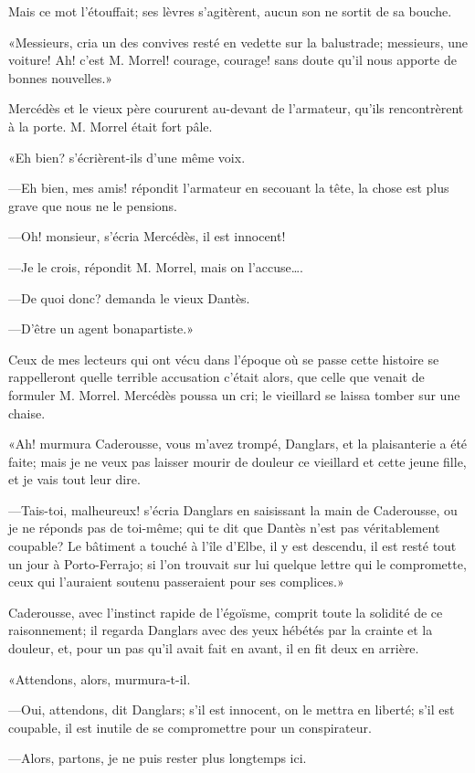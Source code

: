 Mais ce mot l'étouffait; ses lèvres s'agitèrent, aucun son ne sortit de sa bouche.

«Messieurs, cria un des convives resté en vedette sur la balustrade; messieurs, une voiture! Ah! c'est M. Morrel! courage, courage! sans doute qu'il nous apporte de bonnes nouvelles.»

Mercédès et le vieux père coururent au-devant de l'armateur, qu'ils rencontrèrent à la porte. M. Morrel était fort pâle.

«Eh bien? s'écrièrent-ils d'une même voix.

—Eh bien, mes amis! répondit l'armateur en secouant la tête, la chose est plus grave que nous ne le pensions.

—Oh! monsieur, s'écria Mercédès, il est innocent!

—Je le crois, répondit M. Morrel, mais on l'accuse\dots.

—De quoi donc? demanda le vieux Dantès.

—D'être un agent bonapartiste.»

Ceux de mes lecteurs qui ont vécu dans l'époque où se passe cette histoire se rappelleront quelle terrible accusation c'était alors, que celle que venait de formuler M. Morrel. Mercédès poussa un cri; le vieillard se laissa tomber sur une chaise.

«Ah! murmura Caderousse, vous m'avez trompé, Danglars, et la plaisanterie a été faite; mais je ne veux pas laisser mourir de douleur ce vieillard et cette jeune fille, et je vais tout leur dire.

—Tais-toi, malheureux! s'écria Danglars en saisissant la main de Caderousse, ou je ne réponds pas de toi-même; qui te dit que Dantès n'est pas véritablement coupable? Le bâtiment a touché à l'île d'Elbe, il y est descendu, il est resté tout un jour à Porto-Ferrajo; si l'on trouvait sur lui quelque lettre qui le compromette, ceux qui l'auraient soutenu passeraient pour ses complices.»

Caderousse, avec l'instinct rapide de l'égoïsme, comprit toute la solidité de ce raisonnement; il regarda Danglars avec des yeux hébétés par la crainte et la douleur, et, pour un pas qu'il avait fait en avant, il en fit deux en arrière.

«Attendons, alors, murmura-t-il.

—Oui, attendons, dit Danglars; s'il est innocent, on le mettra en liberté; s'il est coupable, il est inutile de se compromettre pour un conspirateur.

—Alors, partons, je ne puis rester plus longtemps ici.


